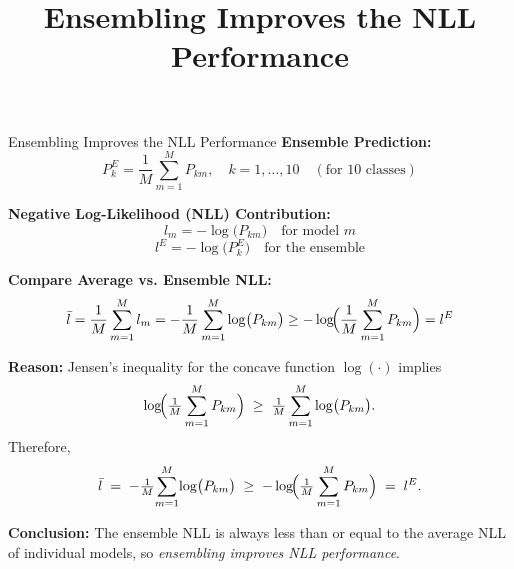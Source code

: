 \documentclass{beamer}
\title{Ensembling Improves the NLL Performance}
\author{ }
\date{ }
\begin{document}
\begin{frame}{Ensembling Improves the NLL Performance}
  \textbf{Ensemble Prediction:}  
  \[
    P_k^E = \frac{1}{M} \sum_{m=1}^{M} P_{km}, 
    \quad k = 1, \ldots, 10 
    \quad (\text{for 10 classes})
  \]
  \medskip
  
  \textbf{Negative Log-Likelihood (NLL) Contribution:}
  \[
    l_m = -\log\bigl(P_{km}\bigr)
    \quad\text{for model } m
  \]
  \[
    l^E = -\log\bigl(P_k^E\bigr)
    \quad\text{for the ensemble}
  \]
  \medskip

  \textbf{Compare Average vs. Ensemble NLL:}
  \[
    \bar{l} = \frac{1}{M} \sum_{m=1}^{M} l_m 
    = -\frac{1}{M} \sum_{m=1}^{M} \log\bigl(P_{km}\bigr) 
    \ge -\log\!\Bigl(\frac{1}{M} \sum_{m=1}^{M} P_{km}\Bigr) = l^E    
  \]
  

  \textbf{Reason:} Jensen's inequality for the concave function 
  \(\log(\cdot)\) implies
  \[
    \log\!\Bigl(\tfrac{1}{M}\sum_{m=1}^{M} P_{km}\Bigr)
    \;\ge\;
    \tfrac{1}{M}\sum_{m=1}^{M} \log\bigl(P_{km}\bigr).
  \]
  Therefore,
  \[
    \bar{l} \;=\; -\tfrac{1}{M}\!\sum_{m=1}^{M}\!\log\bigl(P_{km}\bigr)
    \;\ge\;
    -\log\!\Bigl(\tfrac{1}{M}\sum_{m=1}^{M} P_{km}\Bigr)
    \;=\;
    l^E.
  \]

  \textbf{Conclusion:} The ensemble NLL is always less than or equal to the
  average NLL of individual models, so \emph{ensembling improves NLL performance}.
\end{frame}
\end{document}
